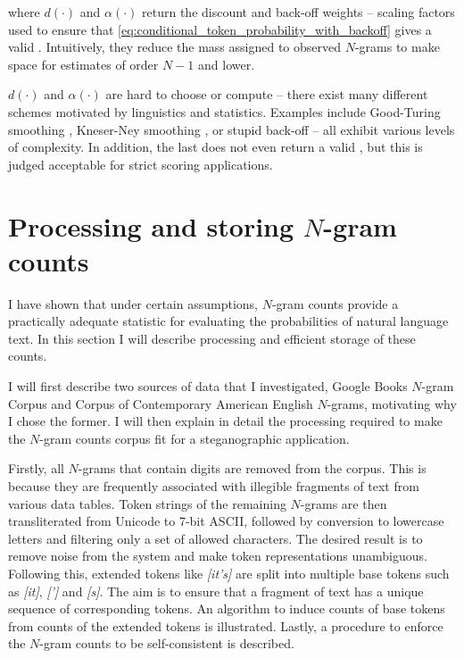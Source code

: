\documentclass[draft]{IIBproject}
\makeatletter
\DeclareRobustCommand*{\AbbreviationWithDot}[1]{\@ifnextchar{.}{#1}{#1.\@\xspace}}
\DeclareRobustCommand*{\pmf}{\AbbreviationWithDot{p.m.f}}
\DeclareRobustCommand{\ngram}[1]{\emph{[#1]}}
\makeatother
\begin{document}
where $d(\cdot)$ and $\alpha(\cdot)$ return the discount and back-off weights -- scaling factors used to ensure that \cref{eq:conditional_token_probability_with_backoff} gives a valid \pmf. Intuitively, they reduce the mass assigned to observed $N$-grams to make space for estimates of order $N{-}1$ and lower.

$d(\cdot)$ and $\alpha(\cdot)$ are hard to choose or compute -- there exist many different schemes motivated by linguistics and statistics. Examples include Good-Turing smoothing \cite{good1953}, Kneser-Ney smoothing \cite{kneserney1995}, or stupid back-off \cite{brants2007} -- all exhibit various levels of complexity. In addition, the last does not even return a valid \pmf, but this is judged acceptable for strict scoring applications.

\clearpage
\section{Processing and storing $N$-gram counts}
\label{sec:processing_ngrams}

I have shown that under certain assumptions, $N$-gram counts provide a practically adequate statistic for evaluating the probabilities of natural language text. In this section I will describe processing and efficient storage of these counts.

I will first describe two sources of data that I investigated, Google Books $N$-gram Corpus and Corpus of Contemporary American English $N$-grams, motivating why I chose the former. I will then explain in detail the processing required to make the $N$-gram counts corpus fit for a steganographic application.

Firstly, all $N$-grams that contain digits are removed from the corpus. This is because they are frequently associated with illegible fragments of text from various data tables. Token strings of the remaining $N$-grams are then transliterated from Unicode to 7-bit ASCII, followed by conversion to lowercase letters and filtering only a set of allowed characters. The desired result is to remove noise from the system and make token representations unambiguous. Following this, extended tokens like \ngram{it's} are split into multiple base tokens such as \ngram{it}, \ngram{'} and \ngram{s}. The aim is to ensure that a fragment of text has a unique sequence of corresponding tokens. An algorithm to induce counts of base tokens from counts of the extended tokens is illustrated. Lastly, a procedure to enforce the $N$-gram counts to be self-consistent is described.
\end{document}
